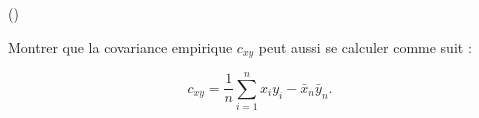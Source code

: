 \begin{exercice}\label{exo2-4} (\minsyndical)

Montrer que la covariance empirique $c_{xy}$ peut aussi se calculer comme suit :

\[ c_{xy} = \frac1n \sum_{i=1}^n x_i y_i - \bar{x}_n \bar{y}_n. \]

\end{exercice}
